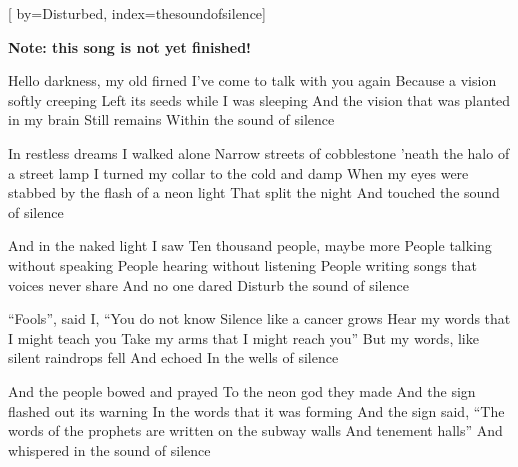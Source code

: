 
[%
    by={Disturbed},
    index={thesoundofsilence}]


    \label{thesoundofsilence}

    \textbf{Note: this song is not yet finished!}

    \beginverse
        Hello darkness, my old firned
        I've come to talk with you again
        Because a vision softly creeping
        Left its seeds while I was sleeping
        And the vision that was planted in my brain
        Still remains
        Within the sound of silence
    \endverse

    \beginverse
        In restless dreams I walked alone
        Narrow streets of cobblestone
        'neath the halo of a street lamp
        I turned my collar to the cold and damp
        When my eyes were stabbed by the flash of a neon light
        That split the night
        And touched the sound of silence
    \endverse

    \beginverse
        And in the naked light I saw
        Ten thousand people, maybe more
        People talking without speaking
        People hearing without listening
        People writing songs that voices never share
        And no one dared
        Disturb the sound of silence
    \endverse

    \beginverse
        ``Fools'', said I, ``You do not know
        Silence like a cancer grows
        Hear my words that I might teach you
        Take my arms that I might reach you''
        But my words, like silent raindrops fell
        And echoed
        In the wells of silence
    \endverse

    \beginverse
        And the people bowed and prayed
        To the neon god they made
        And the sign flashed out its warning
        In the words that it was forming
        And the sign said, ``The words of the prophets are written on the subway walls
        And tenement halls''
        And whispered in the sound of silence
    \endverse
\endsong
